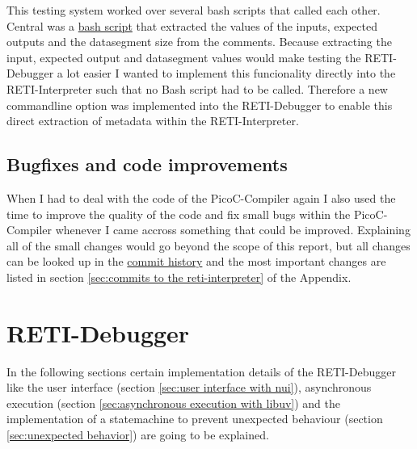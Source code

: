 \documentclass{report}
\begin{document}
This testing system worked over several bash scripts that called each other. Central was a \href{https://github.com/matthejue/PicoC-Compiler/blob/missing_semester_project/extract_input_and_expected.sh}{bash script} that extracted the values of the inputs, expected outputs and the datasegment size from the comments. Because extracting the input, expected output and datasegment values would make testing the RETI-Debugger a lot easier I wanted to implement this funcionality directly into the RETI-Interpreter such that no Bash script had to be called. Therefore a new commandline option  was implemented into the RETI-Debugger to enable this direct extraction of metadata within the RETI-Interpreter.

\section{Bugfixes and code improvements}
\label{sec:bugfixes and code improvements}

When I had to deal with the code of the PicoC-Compiler again I also used the time to improve the quality of the code and fix small bugs within the PicoC-Compiler whenever I came accross something that could be improved. Explaining all of the small changes would go beyond the scope of this report, but all changes can be looked up in the \href{https://github.com/matthejue/PicoC-Compiler/commits/missing_semester_project}{commit history} and the most important changes are listed in section \ref{sec:commits to the reti-interpreter} of the Appendix.

\vspace{0.5cm}
\chapter{RETI-Debugger}
\label{ch:reti-debugger}

In the following sections certain implementation details of the RETI-Debugger like the user interface (section \ref{sec:user interface with nui}), asynchronous execution (section \ref{sec:asynchronous execution with libuv}) and the implementation of a statemachine to prevent unexpected behaviour (section \ref{sec:unexpected behavior}) are going to be explained.


\end{document}
